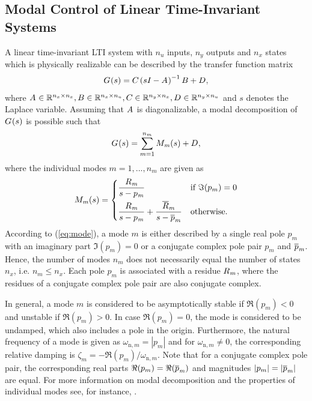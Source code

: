 \documentclass[aerospace,article,submit,moreauthors,pdftex,10pt,a4paper]{Definitions/mdpi}
\begin{document}
\subsection{Modal Control of Linear Time-Invariant Systems}
\label{sec:description}
A  linear time-invariant \ac{LTI} system with $n_u$ inputs, $n_y$ outputs and $n_x$ states which is physically realizable can be described by the transfer function matrix
%
\begin{align}
\label{eq:tfm}
\aemat{G}{}(s)=
\aemat{C}{}\left(s\aemat{I}{}-\aemat{A}{}\right)^{-1} \aemat{B}{} + \aemat{D}{},
\end{align}
where
%
$
\aemat{A}{} \in \mathbb{R}^{n_x \times n_x},
\aemat{B}{} \in \mathbb{R}^{n_x \times n_u},
\aemat{C}{} \in \mathbb{R}^{n_y \times n_x},
\aemat{D}{} \in \mathbb{R}^{n_y \times n_u}
$
%
and $s$ denotes the Laplace variable.
%
Assuming that $\aemat{A}{}$ is diagonalizable, a modal decomposition of $\aemat{G}{}(s)$ is possible such that
%
\begin{align*}
\aemat{G}{}(s)=\sum^{n_m}_{m=1} \aemat{M}{m}(s) + \aemat{D}{},
\end{align*}
%
where the individual modes $m=1,...,n_m$ are given as
%
\begin{align}
\label{eq:mode}
\aemat{M}{m}(s)=
\begin{cases}
\dfrac{\aemat{R}{m}}{s- \aesym{p}{m}} &
\text{if } \Im{(p_m)}=0 \\[2ex]
\dfrac{\aemat{R}{m}}{s- \aesym{p}{m}} + 
\dfrac{\aematb{R}{m}}{s-\aesymb{p}{m}} &
\text{otherwise.}
\end{cases}
\end{align}
%
According to (\ref{eq:mode}), a mode $m$ is either described by a single real pole $p_m$ with an imaginary part $\Im{(p_m)}=0$  or a conjugate complex pole pair $p_m$ and $\aesymb{p}{m}$. 
Hence, the number of modes $n_m$ does not necessarily equal the number of states $n_x$, i.e. $n_m \leq n_x$.
Each pole $p_m$ is associated with a residue 
$\aemat{R}{m}$,
where the residues of a conjugate complex pole pair are also conjugate complex.

In general, a mode $m$ is considered to be asymptotically stable if $\Re{(p_m)}<0$ and unstable if $\Re{(p_m)}>0$. In case $\Re{(p_m)}=0$, the mode is considered to be undamped, which also includes a pole in the origin. 
Furthermore, the natural frequency of a mode is given as
$\omega_{\text{n},m} = |p_m| $
and for $\omega_{\text{n},m} \neq 0$, the corresponding relative damping is
$\zeta_m = -\Re{(p_m)} / \omega_{\text{n},m}$. 
Note that for a conjugate complex pole pair, the corresponding real parts $\Re{(p_m)}=\Re{(\aesymb{p}{m})}$ and magnitudes $|p_m|=|\aesymb{p}{m}|$ are equal. For more information on modal decomposition and the properties of individual modes see, for instance, \cite{Skoge_05}.
\end{document}
